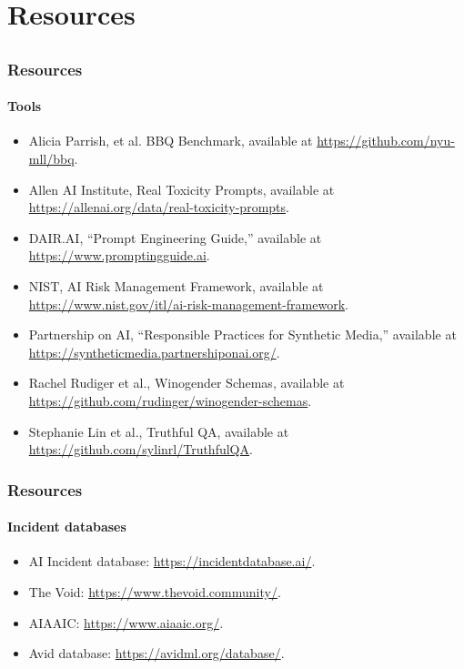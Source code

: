\documentclass[11pt,
               aspectratio=169,
               hyperref={colorlinks}
               ]{beamer}
\begin{document}
 	\section{Resources} 
		\subsection*{} %

		\begin{frame}
			
			\frametitle{Resources}
			\framesubtitle{Tools}
			
			\begin{itemize}\small
				\item Alicia Parrish, et al. BBQ Benchmark, available at \url{https://github.com/nyu-mll/bbq}.
				\item Allen AI Institute, Real Toxicity Prompts, available at \url{https://allenai.org/data/real-toxicity-prompts}.
				\item DAIR.AI, “Prompt Engineering Guide,” available at \url{https://www.promptingguide.ai}.
				\item NIST, AI Risk Management Framework, available at \url{https://www.nist.gov/itl/ai-risk-management-framework}.
				\item Partnership on AI, “Responsible Practices for Synthetic Media,” available at \url{https://syntheticmedia.partnershiponai.org/}. 
				\item Rachel Rudiger et al., Winogender Schemas, available at \url{https://github.com/rudinger/winogender-schemas}.
				\item Stephanie Lin et al., Truthful QA, available at \url{https://github.com/sylinrl/TruthfulQA}.
			\end{itemize}	
			
		\end{frame}	

		\begin{frame}
			
			\frametitle{Resources}
			\framesubtitle{Incident databases}
			
			\begin{itemize}
				\item AI Incident database: \url{https://incidentdatabase.ai/}.
				\item The Void: \url{https://www.thevoid.community/}.
				\item AIAAIC: \url{https://www.aiaaic.org/}.
				\item Avid database: \url{https://avidml.org/database/}.
			\end{itemize}	
			
		\end{frame}
\end{document}
